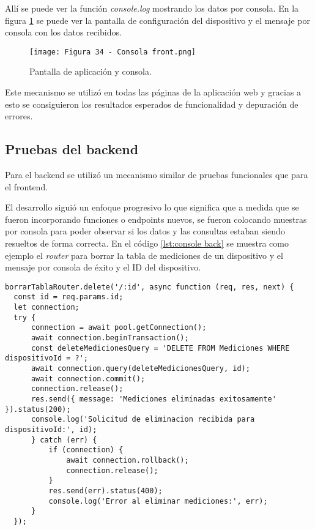 Allí se puede ver la función \textit{console.log} mostrando los datos por consola. En la figura \ref{fig:34} se puede ver la pantalla de configuración del dispositivo y el mensaje por consola con los datos recibidos.

\begin{figure}[h]
\centering
\texttt{[image: Figura 34 - Consola front.png]}
\caption[Prueba frontend]{Pantalla de aplicación y consola.}
\label{fig:34}
\end{figure}

Este mecanismo se utilizó en todas las páginas de la aplicación web y gracias a esto se consiguieron los resultados esperados de funcionalidad y depuración de errores.

\subsection{Pruebas del backend}

Para el backend se utilizó un mecanismo similar de pruebas funcionales que para el frontend.

El desarrollo siguió un enfoque progresivo lo que significa que a medida que se fueron incorporando funciones o endpoints nuevos, se fueron colocando muestras por consola para poder observar si los datos y las consultas estaban siendo resueltos de forma correcta. En el código \ref{lst:console back} se muestra como ejemplo el \textit{router} para borrar la tabla de mediciones de un dispositivo y el mensaje por consola de éxito y el ID del dispositivo.

\begin{lstlisting}[caption={Muestra por consola de los datos consultados.}, label={lst:console back}]
borrarTablaRouter.delete('/:id', async function (req, res, next) {
  const id = req.params.id;
  let connection;
  try {
      connection = await pool.getConnection();
      await connection.beginTransaction();
      const deleteMedicionesQuery = 'DELETE FROM Mediciones WHERE dispositivoId = ?';
      await connection.query(deleteMedicionesQuery, id);
      await connection.commit();
      connection.release();
      res.send({ message: 'Mediciones eliminadas exitosamente' }).status(200);
      console.log('Solicitud de eliminacion recibida para dispositivoId:', id);
      } catch (err) {
          if (connection) {
              await connection.rollback();
              connection.release();
          }
          res.send(err).status(400);
          console.log('Error al eliminar mediciones:', err);
      }
  });
\end{lstlisting}

